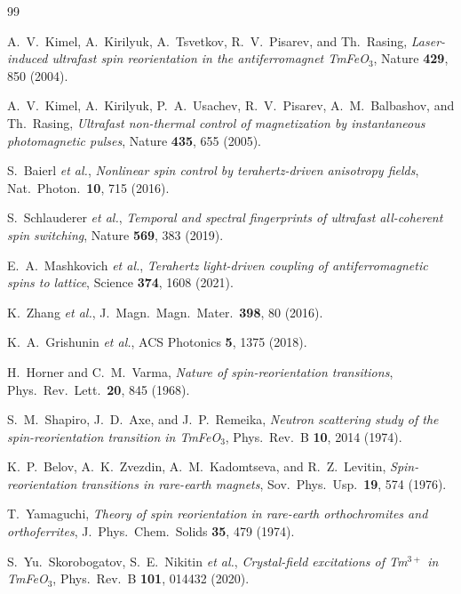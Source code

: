 \documentclass[reprint,amsmath,amssymb,aps,prb,longbibliography]{revtex4-2}
\begin{document}
\begin{thebibliography}{99}

A.~V.~Kimel, A.~Kirilyuk, A.~Tsvetkov, R.~V.~Pisarev, and Th.~Rasing,
\emph{Laser-induced ultrafast spin reorientation in the antiferromagnet TmFeO$_3$},
Nature \textbf{429}, 850 (2004).

A.~V.~Kimel, A.~Kirilyuk, P.~A.~Usachev, R.~V.~Pisarev, A.~M.~Balbashov, and Th.~Rasing,
\emph{Ultrafast non-thermal control of magnetization by instantaneous photomagnetic pulses},
Nature \textbf{435}, 655 (2005).

S.~Baierl \emph{et al.},
\emph{Nonlinear spin control by terahertz-driven anisotropy fields},
Nat.\ Photon.\ \textbf{10}, 715 (2016).

S.~Schlauderer \emph{et al.},
\emph{Temporal and spectral fingerprints of ultrafast all-coherent spin switching},
Nature \textbf{569}, 383 (2019).

E.~A.~Mashkovich \emph{et al.},
\emph{Terahertz light-driven coupling of antiferromagnetic spins to lattice},
Science \textbf{374}, 1608 (2021).

K.~Zhang \emph{et al.}, J.\ Magn.\ Magn.\ Mater.\ \textbf{398}, 80 (2016).

K.~A.~Grishunin \emph{et al.},
ACS Photonics \textbf{5}, 1375 (2018).

H.~Horner and C.~M.~Varma,
\emph{Nature of spin-reorientation transitions},
Phys.\ Rev.\ Lett.\ \textbf{20}, 845 (1968).

S.~M.~Shapiro, J.~D.~Axe, and J.~P.~Remeika,
\emph{Neutron scattering study of the spin-reorientation transition in TmFeO$_3$},
Phys.\ Rev.\ B \textbf{10}, 2014 (1974).

K.~P.~Belov, A.~K.~Zvezdin, A.~M.~Kadomtseva, and R.~Z.~Levitin,
\emph{Spin-reorientation transitions in rare-earth magnets},
Sov.\ Phys.\ Usp.\ \textbf{19}, 574 (1976).

T.~Yamaguchi,
\emph{Theory of spin reorientation in rare-earth orthochromites and orthoferrites},
J.\ Phys.\ Chem.\ Solids \textbf{35}, 479 (1974).

S.~Yu.~Skorobogatov, S.~E.~Nikitin \emph{et al.},
\emph{Crystal-field excitations of Tm$^{3+}$ in TmFeO$_3$},
Phys.\ Rev.\ B \textbf{101}, 014432 (2020).


\end{thebibliography}
\end{document}

